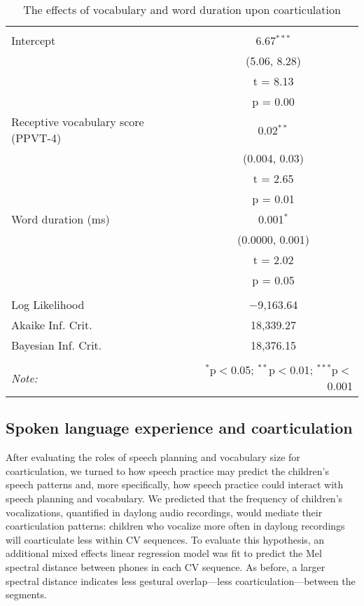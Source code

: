 \documentclass[a4paper,man,natbib,donotrepeattitle, apacite]{apa6}
\begin{document}
\begin{table}[!htbp] \centering 
  \caption{The effects of vocabulary and word duration upon coarticulation} 
  \label{tab:model-1} 
\begin{tabular}{@{\extracolsep{5pt}}lc} 
\\[-1.8ex]\hline 
\hline \\[-1.8ex] 
 Intercept & 6.67$^{***}$ \\ 
  & (5.06, 8.28) \\ 
  & t = 8.13 \\ 
  & p = 0.00 \\ 
  Receptive vocabulary score (PPVT-4) & 0.02$^{**}$ \\ 
  & (0.004, 0.03) \\ 
  & t = 2.65 \\ 
  & p = 0.01 \\ 
  Word duration (ms) & 0.001$^{*}$ \\ 
  & (0.0000, 0.001) \\ 
  & t = 2.02 \\ 
  & p = 0.05 \\ 
 \hline \\[-1.8ex] 
Log Likelihood & $-$9,163.64 \\ 
Akaike Inf. Crit. & 18,339.27 \\ 
Bayesian Inf. Crit. & 18,376.15 \\ 
\hline 
\hline \\[-1.8ex] 
\textit{Note:}  & \multicolumn{1}{r}{$^{*}$p$<$0.05; $^{**}$p$<$0.01; $^{***}$p$<$0.001} \\ 
\end{tabular} 
\end{table}


\subsection{Spoken language experience and coarticulation}

After evaluating the roles of speech planning and vocabulary size for coarticulation, we turned to how speech practice may predict the children’s speech patterns and, more specifically, how speech practice could interact with speech planning and vocabulary. We predicted that the frequency of children’s vocalizations, quantified in daylong audio recordings, would mediate their coarticulation patterns: children who vocalize more often in daylong recordings will coarticulate less within CV sequences. To evaluate this hypothesis, an additional mixed effects linear regression model was fit to predict the Mel spectral distance between phones in each CV sequence. As before, a larger spectral distance indicates less gestural overlap---less coarticulation---between the segments.
\end{document}
